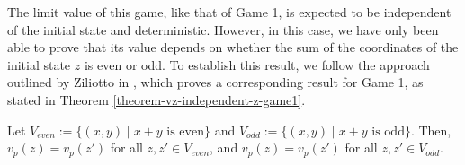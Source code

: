 The limit value of this game, like that of Game 1, is expected to be independent of the initial state and deterministic. However, in this case, we have only been able to prove that its value depends on whether the sum of the coordinates of the initial state $z$ is even or odd. To establish this result, we follow the approach outlined by Ziliotto in \cite{Ziliotto2023}, which proves a corresponding result for Game 1, as stated in Theorem \ref{theorem-vz-independent-z-game1}.

\begin{theorem}
      Let $V_{even} := \{(x, y) \mid x+y \text{ is even}\}$ and $V_{odd} := \{(x, y) \mid x+y \text{ is odd}\}$. Then, $v_p(z) = v_p(z')$ for all $z, z' \in V_{even}$, and $v_p(z) = v_p(z')$ for all $z, z' \in V_{odd}$.  
\end{theorem}

